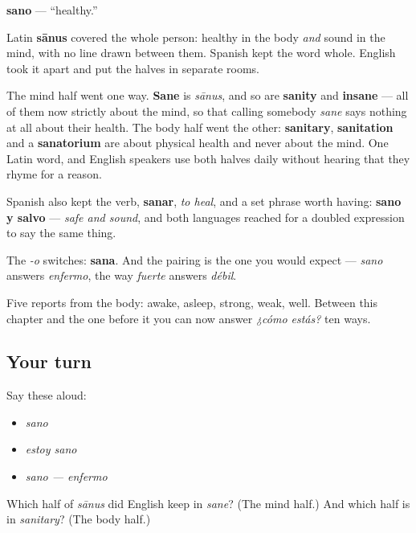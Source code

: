 \begin{cousinweb}
\textbf{sano} — \textquotedblleft{}healthy.\textquotedblright{}

Latin \textbf{sānus} covered the whole person: healthy in the body \emph{and} sound in the mind, with no line drawn between them. Spanish kept the word whole. English took it apart and put the halves in separate rooms.

The mind half went one way. \textbf{Sane} is \emph{sānus}, and so are \textbf{sanity} and \textbf{insane} — all of them now strictly about the mind, so that calling somebody \emph{sane} says nothing at all about their health. The body half went the other: \textbf{sanitary}, \textbf{sanitation} and a \textbf{sanatorium} are about physical health and never about the mind. One Latin word, and English speakers use both halves daily without hearing that they rhyme for a reason.

Spanish also kept the verb, \textbf{sanar}, \emph{to heal}, and a set phrase worth having: \textbf{sano y salvo} — \emph{safe and sound}, and both languages reached for a doubled expression to say the same thing.

The \emph{-o} switches: \textbf{sana}. And the pairing is the one you would expect — \emph{sano} answers \emph{enfermo}, the way \emph{fuerte} answers \emph{débil}.
\end{cousinweb}

\begin{grammarlens}[title={What you've built}]
Five reports from the body: awake, asleep, strong, weak, well. Between this chapter and the one before it you can now answer \emph{¿cómo estás?} ten ways.
\end{grammarlens}

\subsection*{Your turn}
Say these aloud:

\begin{itemize}
\raggedright
  \item \emph{sano}
  \item \emph{estoy sano}
  \item \emph{sano — enfermo}
\end{itemize}

\begin{tcolorbox}[breakable,colback=teal!4,colframe=teal!35!black,title={Before you move on}]
Which half of \emph{sānus} did English keep in \emph{sane}? (The mind half.) And which half is in \emph{sanitary}? (The body half.)
\end{tcolorbox}
